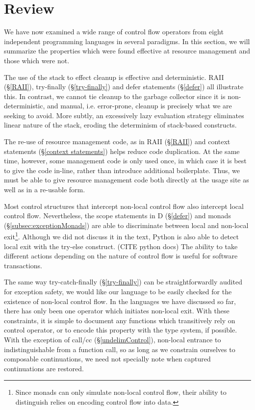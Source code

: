 \documentclass[11pt]{article}
\newcommand{\maybePage}{\newpage}
\begin{document}
\maybePage
\section{Review}
\label{sec:review}

We have now examined a wide range of control flow operators from eight independent programming languages in several paradigms.
In this section, we will summarize the properties which were found effective at resource management and those which were not.

The use of the stack to effect cleanup is effective and deterministic.
RAII (\S\ref{RAII}), try-finally (\S\ref{try-finally}) and defer statements (\S\ref{defer}) all illustrate this.
In contrast, we cannot tie cleanup to the garbage collector since it is non-deterministic, and manual, i.e. error-prone, cleanup is precisely what we are seeking to avoid.
More subtly, an excessively lazy evaluation strategy eliminates linear nature of the stack, eroding the determinism of stack-based constructs.

The re-use of resource management code, as in RAII (\S\ref{RAII}) and context statements (\S\ref{context statements}) helps reduce code duplication.
At the same time, however, some management code is only used once, in which case it is best to give the code in-line, rather than introduce additional boilerplate.
Thus, we must be able to give resource management code both directly at the usage site as well as in a re-usable form.

Most control structures that intercept non-local control flow also intercept local control flow.
Nevertheless, the scope statements in D (\S\ref{defer}) and monads (\S\ref{subsec:exceptionMonads}) are able to discriminate between local and non-local exit\footnote{Since monads can only simulate non-local control flow, their ability to distinguish relies on encoding control flow into data.}.
Although we did not discuss it in the text, Python is also able to detect local exit with the try-else construct. (CITE python docs)
The ability to take different actions depending on the nature of control flow is useful for software transactions.

The same way try-catch-finally (\S\ref{try-finally}) can be straightforwardly audited for exception safety, we would like our language to be easily checked for the existence of non-local control flow.
In the languages we have discussed so far, there has only been one operator which initiates non-local exit.
With these constraints, it is simple to document any functions which transitively rely on control operator, or to encode this property with the type system, if possible.
With the exception of call/cc (\S\ref{undelimControl}), non-local entrance to indistinguishable from a function call, so as long as we constrain ourselves to composable continuations, we need not specially note when captured continuations are restored.
\end{document}
